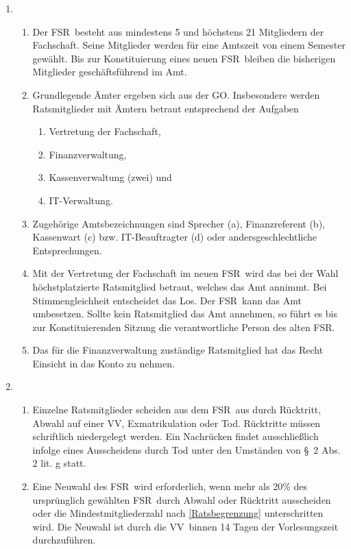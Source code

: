 \documentclass[a4paper, 12pt]{article}
\newcommand{\vv}{VV}
\newcommand{\rat}{FSR}
\newcommand{\rates}{FSR}
\begin{document}
\begin{enumerate}[leftmargin=0cm]
	\item {}
	\begin{enumerate}[leftmargin=0cm]
		\item Der \rat~besteht aus mindestens 5 und höchstens 21 Mitgliedern der Fachschaft.\label{Ratsbegrenzung} Seine Mitglieder werden für eine Amtszeit von einem
		Semester gewählt.
		Bis zur Konstituierung eines neuen \rates~bleiben die bisherigen Mitglieder geschäftsführend im Amt.
		\item Grundlegende Ämter ergeben sich aus der GO. Insbesondere werden Ratsmitglieder
		mit Ämtern betraut entsprechend der Aufgaben \label{AmterDesRates}
		\begin{enumerate}[leftmargin=0.5cm]
			\item Vertretung der Fachschaft,
			\item Finanzverwaltung,
			\item Kassenverwaltung (zwei) und
			\item IT-Verwaltung.
		\end{enumerate}
		\item Zugehörige Amtsbezeichnungen sind Sprecher (a), Finanzreferent (b), Kassenwart (c) bzw. IT-Beauftragter (d) oder andersgeschlechtliche Entsprechungen.
		\item Mit der Vertretung der Fachschaft im neuen \rat~wird das bei der Wahl höchstplatzierte Ratsmitglied betraut, welches das Amt annimmt. Bei Stimmengleichheit entscheidet das Los. Der \rat~kann das Amt umbesetzen. Sollte kein Ratsmitglied das Amt annehmen, so führt es bis zur Konstituierenden Sitzung die verantwortliche Person des alten \rates.
		\item Das für die Finanzverwaltung zuständige Ratsmitglied hat das Recht Einsicht in das Konto zu nehmen.
	\end{enumerate}

	\item {}
	\begin{enumerate}[leftmargin=0cm]
		\item Einzelne Ratsmitglieder scheiden aus dem \rat~aus durch Rücktritt, Abwahl auf einer \vv, Exmatrikulation oder Tod. Rücktritte müssen schriftlich niedergelegt werden. Ein Nachrücken findet ausschließlich infolge eines Ausscheidens durch Tod unter den Umständen von §~2 Abs. 2 lit. g statt.\label{AusscheidenRat} 
		\item Eine Neuwahl des \rates~wird erforderlich, wenn mehr als 20\% des ursprünglich gewählten \rates~durch Abwahl oder Rücktritt ausscheiden oder die Mindestmitgliederzahl nach \cref{Ratsbegrenzung} unterschritten wird. Die Neuwahl ist durch die \vv~binnen 14 Tagen der Vorlesungszeit durchzuführen. \label{Neuwahlerf}
	\end{enumerate}


\end{enumerate}
\end{document}
